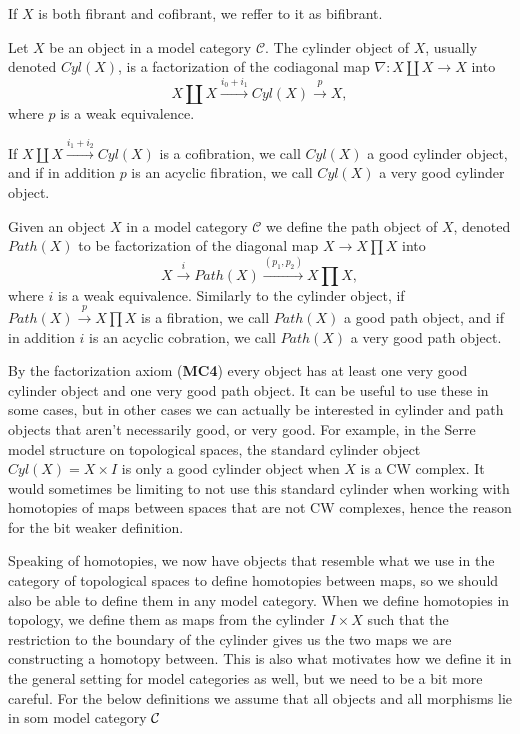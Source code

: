 If $X$ is both fibrant and cofibrant, we reffer to it as bifibrant. 



\begin{definition}
Let $X$ be an object in a model category $\mathcal{C}$. The cylinder object of $X$, usually denoted $Cyl(X)$, is a factorization of the codiagonal map $\nabla: X\coprod X\longrightarrow X$ into
\begin{equation*}
    X\coprod X\overset{i_0+i_1}\longrightarrow Cyl(X) \overset{p}\longrightarrow X,
\end{equation*} 
where $p$ is a weak equivalence. 

If $X\coprod X\overset{i_1 + i_2}\rightarrow Cyl(X)$ is a cofibration, we call $Cyl(X)$ a good cylinder object, and if in addition $p$ is an acyclic fibration, we call $Cyl(X)$ a very good cylinder object.
\end{definition}

\begin{definition}
Given an object $X$ in a model category $\mathcal{C}$ we define the path object of $X$, denoted $Path(X)$ to be factorization of the diagonal map $X \rightarrow X\prod X$ into
\begin{equation*}
     X \overset{i}\rightarrow Path(X) \overset{(p_1,p_2)}\rightarrow X \prod X,
\end{equation*}
where $i$ is a weak equivalence. Similarly to the cylinder object, if $Path(X)\overset{p}\rightarrow X\prod X$ is a fibration, we call $Path(X)$ a good path object, and if in addition $i$ is an acyclic cobration, we call $Path(X)$ a very good path object.
\end{definition}

By the factorization axiom (\textbf{MC4}) every object has at least one very good cylinder object and one very good path object. It can be useful to use these in some cases, but in other cases we can actually be interested in cylinder and path objects that aren't necessarily good, or very good. For example, in the Serre model structure on topological spaces, the standard cylinder object $Cyl(X)=X\times I$ is only a good cylinder object when $X$ is a CW complex. It would sometimes be limiting to not use this standard cylinder when working with homotopies of maps between spaces that are not CW complexes, hence the reason for the bit weaker definition. 

Speaking of homotopies, we now have objects that resemble what we use in the category of topological spaces to define homotopies between maps, so we should also be able to define them in any model category. When we define homotopies in topology, we define them as maps from the cylinder $I\times X$ such that the restriction to the boundary of the cylinder gives us the two maps we are constructing a homotopy between. This is also what motivates how we define it in the general setting for model categories as well, but we need to be a bit more careful. For the below definitions we assume that all objects and all morphisms lie in som model category $\mathcal{C}$

